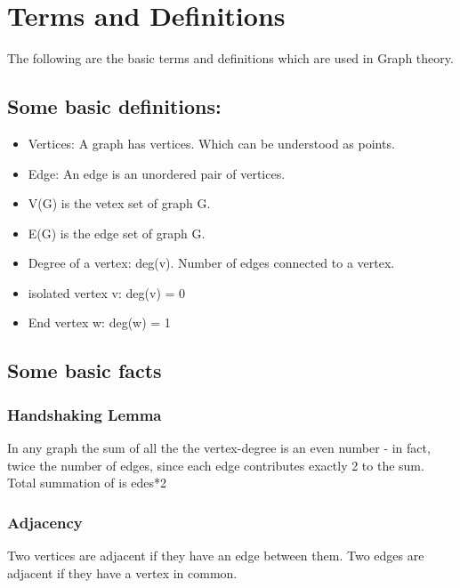 \hypertarget{terms-and-definitions}{%
\section{Terms and Definitions}\label{terms-and-definitions}}
The following are the basic terms and definitions which are
used in Graph theory.
\hypertarget{some-basic-definitions}{%
\subsection{Some basic definitions:}\label{some-basic-definitions}}

\begin{itemize}
\item
  Vertices: A graph has vertices. Which can be understood as points.
\item
  Edge: An edge is an unordered pair of vertices.
\item
  V(G) is the vetex set of graph G.
\item
  E(G) is the edge set of graph G.
\item
  Degree of a vertex: deg(v). Number of edges connected to a vertex.
\item
  isolated vertex v: deg(v) = 0
\item
  End vertex w: deg(w) = 1
\end{itemize}

\hypertarget{some-basic-facts}{%
\subsection{Some basic facts}\label{some-basic-facts}}

\hypertarget{handshaking-lemma}{%
\subsubsection{Handshaking Lemma}\label{handshaking-lemma}}

In any graph the sum of all the the vertex-degree is an even number - in
fact, twice the number of edges, since each edge contributes exactly 2
to the sum. Total summation of is edes*2

\hypertarget{adjacency}{%
\subsubsection{Adjacency}\label{adjacency}}

Two vertices are adjacent if they have an edge between them. Two edges
are adjacent if they have a vertex in common.

